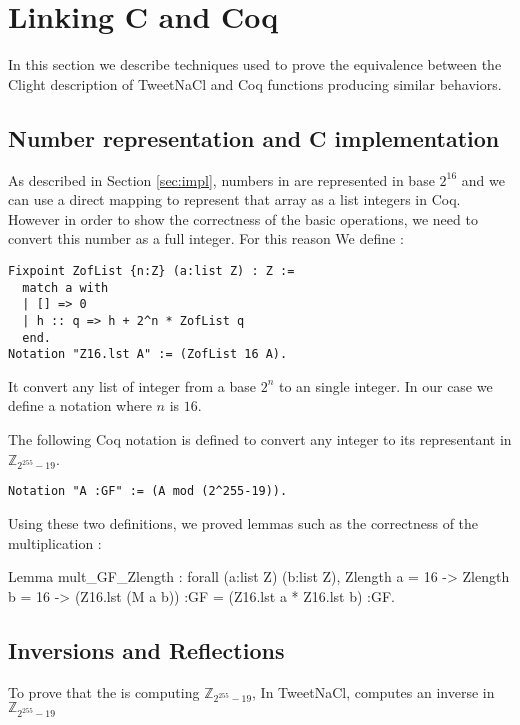 \section{Linking C and Coq}

In this section we describe techniques used to prove the equivalence between the
Clight description of TweetNaCl and Coq functions producing similar behaviors.

\subsection{Number representation and C implementation}

As described in Section \ref{sec:impl}, numbers in  are represented
in base $2^16$ and we can use a direct mapping to represent that array as a list
integers in Coq. However in order to show the correctness of the basic operations,
we need to convert this number as a full integer. For this reason We define
:
\begin{lstlisting}[language=CoqD]
Fixpoint ZofList {n:Z} (a:list Z) : Z :=
  match a with
  | [] => 0
  | h :: q => h + 2^n * ZofList q
  end.
Notation "Z16.lst A" := (ZofList 16 A).
\end{lstlisting}
It convert any list of integer from a base $2^n$ to an single integer. In our
case we define a notation where $n$ is $16$.

The following Coq notation is defined to convert any integer to its representant
in $\mathbb{Z}_{2^{255}-19}$.
\begin{lstlisting}[language=CoqD]
Notation "A :GF" := (A mod (2^255-19)).
\end{lstlisting}

Using these two definitions, we proved lemmas such as the correctness of the
multiplication :
\begin{coqD}
Lemma mult_GF_Zlength :
  forall (a:list Z) (b:list Z),
  Zlength a = 16 ->
  Zlength b = 16 ->
   (Z16.lst (M a b)) :GF =
   (Z16.lst a * Z16.lst b) :GF.
\end{coqD}

\subsection{Inversions and Reflections}

To prove that the  is computing $\mathbb{Z}_{2^{255}-19}$,
In TweetNaCl,  computes an inverse in $\mathbb{Z}_{2^{255}-19}$

